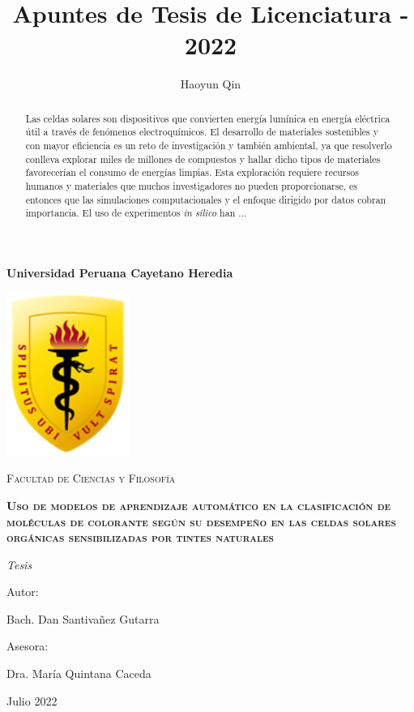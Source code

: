 \documentclass{article}
\title{Apuntes de Tesis de Licenciatura - 2022}
\author{Haoyun Qin}
\theoremstyle{mytheoremstyle}
\theoremstyle{mytheoremstyle}
\theoremstyle{myproblemstyle}
\begin{document}
    \begin{titlepage}
        \centering
        {\bfseries\LARGE Universidad Peruana Cayetano Heredia \par}
        \vspace{1cm}
        {\includegraphics[width=0.3\textwidth]{img/logo_escudo.png}\par}
        \vspace{1cm}
        {\scshape\Large Facultad de Ciencias y Filosofía \par}
        \vspace{1cm}
        {\bfseries\scshape\Large Uso de modelos de aprendizaje automático en la clasificación de moléculas de colorante según su desempeño en las celdas solares orgánicas sensibilizadas por tintes naturales \par}
        \vspace{1cm}
        {\itshape\Large Tesis \par}
        \vfill
        {\Large Autor: \par}
        {\Large Bach. Dan Santivañez Gutarra\par}
        \vfill
        {\Large Asesora: \par}
        {\Large Dra. María Quintana Caceda \par}
        \vfill
        {\Large Julio 2022 \par}
    \end{titlepage}

    \tableofcontents
    \newpage

    \begin{abstract}
        Las celdas solares son dispositivos que convierten energía lumínica en 
        energía eléctrica útil a través de fenómenos electroquímicos. El desarrollo
        de materiales sostenibles y con mayor eficiencia es un reto de investigación
        y también ambiental, ya que resolverlo conlleva explorar miles de millones de 
        compuestos y hallar dicho tipos de materiales favorecerían el consumo de 
        energías limpias. Esta exploración requiere recursos humanos y materiales que
        muchos investigadores no pueden proporcionarse, es entonces que las simulaciones
        computacionales y el enfoque dirigido por datos cobran importancia. El uso de 
        experimentos \textit{in silico} han ... 
    \end{abstract}
\end{document}
